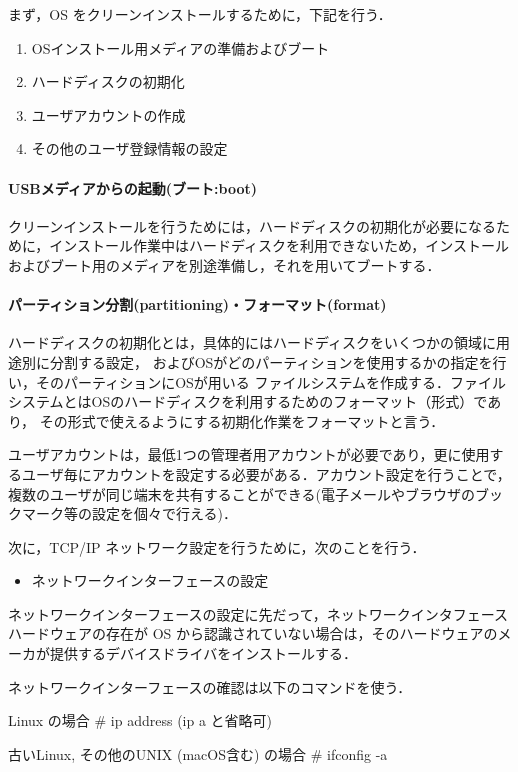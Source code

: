 まず，OS をクリーンインストールするために，下記を行う．

\begin{enumerate}
 \item OSインストール用メディアの準備およびブート
 \item ハードディスクの初期化
 \item ユーザアカウントの作成
 \item その他のユーザ登録情報の設定
\end{enumerate}

\paragraph{USBメディアからの起動(ブート:boot)}
クリーンインストールを行うためには，ハードディスクの初期化が必要になるた
めに，インストール作業中はハードディスクを利用できないため，インストール
およびブート用のメディアを別途準備し，それを用いてブートする．

\paragraph{パーティション分割(partitioning)・フォーマット(format)}
ハードディスクの初期化とは，具体的にはハードディスクをいくつかの領域に用途別に分割する設定，
およびOSがどのパーティションを使用するかの指定を行い，そのパーティションにOSが用いる
ファイルシステムを作成する．ファイルシステムとはOSのハードディスクを利用するためのフォーマット（形式）であり，
その形式で使えるようにする初期化作業をフォーマットと言う．

ユーザアカウントは，最低1つの管理者用アカウントが必要であり，更に使用す
るユーザ毎にアカウントを設定する必要がある．アカウント設定を行うことで，
複数のユーザが同じ端末を共有することができる(電子メールやブラウザのブッ
クマーク等の設定を個々で行える)．

次に，TCP/IP ネットワーク設定を行うために，次のことを行う．

\begin{itemize}
 \item ネットワークインターフェースの設定
\end{itemize}

ネットワークインターフェースの設定に先だって，ネットワークインタフェースハードウェアの存在が OS から認識されていない場合は，そのハードウェアのメーカが提供するデバイスドライバをインストールする．

ネットワークインターフェースの確認は以下のコマンドを使う．

\begin{cli}
Linux の場合
# ip address (ip a と省略可)

古いLinux, その他のUNIX (macOS含む) の場合
# ifconfig -a
\end{cli}

